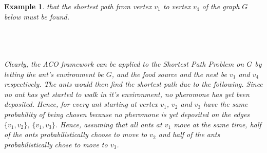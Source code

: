 \documentclass{article}
\newtheorem{example}[definition]{Example}
\begin{document}
\begin{example}
\label{explain_ACO}
 that the shortest path from vertex $v_1$ to vertex $v_4$ of the graph $G$ below must be found.\\\\
\\\\
Clearly, the ACO framework can be applied to the Shortest Path Problem on $G$ by letting the ant's environment be $G$, and the food source and the nest be $v_1$ and $v_4$ respectively. The ants would then find the shortest path due to the following. Since no ant has yet started to walk in it's environment, no pheromone has yet been deposited. Hence, for every ant starting at vertex $v_1$, $v_2$ and $v_3$ have the same probability of being chosen because no pheromone is yet deposited on the edges $\{v_1, v_2\}$, $\{v_1, v_3\}$. Hence, assuming that all ants at $v_1$ move at the same time, half of the ants probabilistically choose to move to $v_2$ and half of the ants probabilistically chose to move to $v_3$.\\\\
\end{example}
\end{document}

